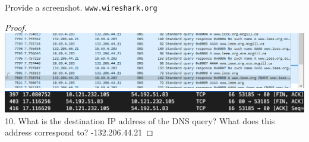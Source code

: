 \documentclass[../../main.tex]{subfiles}
\begin{document}
\begin{wts}
Provide a screenshot. \lstinline{www.wireshark.org} 
\end{wts}
\begin{proof}
\includegraphics[width=\textwidth]{subfiles/images/308_Lab5_Part_1_PAGE0_0_Image20.png}
\includegraphics[width=\textwidth]{subfiles/images/ECSE_308_Lab_5_1_SUPA_PAGE4_16_Image49.png}
10. What is the destination IP address of the DNS query? What does this address correspond to? -132.206.44.21
\end{proof}
\end{document}
